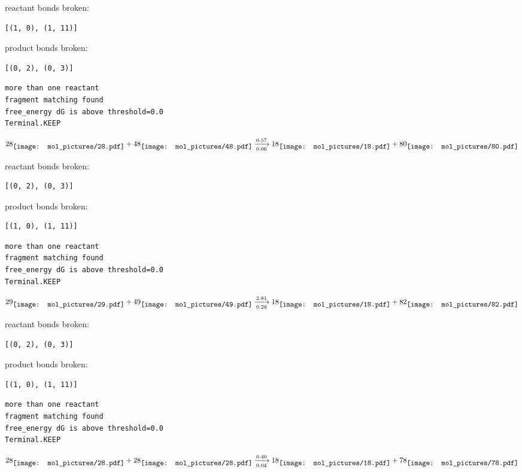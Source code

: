 \documentclass{article}
\begin{document}
reactant bonds broken:\begin{verbatim}
[(1, 0), (1, 11)]
\end{verbatim}
product bonds broken:\begin{verbatim}
[(0, 2), (0, 3)]
\end{verbatim}




\vspace{1cm}
\begin{verbatim}
more than one reactant
fragment matching found
free_energy dG is above threshold=0.0
Terminal.KEEP
\end{verbatim}
$$
28
\raisebox{-.5\height}{\texttt{[image: mol\_pictures/28.pdf]}}
+
48
\raisebox{-.5\height}{\texttt{[image: mol\_pictures/48.pdf]}}
\xrightarrow[0.06]{0.57}
18
\raisebox{-.5\height}{\texttt{[image: mol\_pictures/18.pdf]}}
+
80
\raisebox{-.5\height}{\texttt{[image: mol\_pictures/80.pdf]}}
$$


reactant bonds broken:\begin{verbatim}
[(0, 2), (0, 3)]
\end{verbatim}
product bonds broken:\begin{verbatim}
[(1, 0), (1, 11)]
\end{verbatim}




\vspace{1cm}
\begin{verbatim}
more than one reactant
fragment matching found
free_energy dG is above threshold=0.0
Terminal.KEEP
\end{verbatim}
$$
29
\raisebox{-.5\height}{\texttt{[image: mol\_pictures/29.pdf]}}
+
49
\raisebox{-.5\height}{\texttt{[image: mol\_pictures/49.pdf]}}
\xrightarrow[0.28]{2.81}
18
\raisebox{-.5\height}{\texttt{[image: mol\_pictures/18.pdf]}}
+
82
\raisebox{-.5\height}{\texttt{[image: mol\_pictures/82.pdf]}}
$$


reactant bonds broken:\begin{verbatim}
[(0, 2), (0, 3)]
\end{verbatim}
product bonds broken:\begin{verbatim}
[(1, 0), (1, 11)]
\end{verbatim}




\vspace{1cm}
\begin{verbatim}
more than one reactant
fragment matching found
free_energy dG is above threshold=0.0
Terminal.KEEP
\end{verbatim}
$$
28
\raisebox{-.5\height}{\texttt{[image: mol\_pictures/28.pdf]}}
+
28
\raisebox{-.5\height}{\texttt{[image: mol\_pictures/28.pdf]}}
\xrightarrow[0.04]{0.40}
18
\raisebox{-.5\height}{\texttt{[image: mol\_pictures/18.pdf]}}
+
78
\raisebox{-.5\height}{\texttt{[image: mol\_pictures/78.pdf]}}
$$
\end{document}
